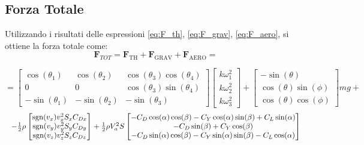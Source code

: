 \clearpage

\subsection{Forza Totale}
Utilizzando i risultati delle espressioni \ref{eq:F_th}, \ref{eq:F_grav}, \ref{eq:F_aero}, si ottiene la forza totale come:
\begin{equation*}
	  	\bm{F}_{TOT} = \bm{F}_{\text{TH}} + \bm{F}_{\text{GRAV}} + \bm{F}_{\text{AERO}} = 
	  	\end{equation*}
	  	
	  	 \begin{equation*}
	  		=  
	  		\begin{bmatrix}
	  			\cos(\theta_{1}) & \cos(\theta_{2}) & {\cos(\theta_{3})\cos(\theta_{4})} \\
	  			0                 & 0                 & {\cos(\theta_{3})\sin(\theta_{4})} \\
	  			-\sin(\theta_{1}) & -\sin(\theta_{2}) & {-\sin(\theta_{3})}
	  		\end{bmatrix}
	  		\begin{bmatrix}
	  			k\omega_{1}^2 \\
	  			k\omega_{2}^2 \\
	  			k\omega_{3}^2 
	  		\end{bmatrix} +  \begin{bmatrix}
	  		-\sin(\theta) \\
	  		\cos(\theta)\sin(\phi) \\
	  		\cos(\theta)\cos(\phi) 
	  		\end{bmatrix} m g +  
	  	\end{equation*}
	  \begin{equation}
	   \resizebox{1\textwidth}{!}{$
        -\frac{1}{2} \rho 
        \begin{bmatrix}
            \operatorname{sgn}(v_x) v_x^2 S_{x} C_{Dx} \\
            \operatorname{sgn}(v_y) v_y^2 S_{y} C_{Dy} \\
            \operatorname{sgn}(v_z) v_z^2 S_{z} C_{Dz}
        \end{bmatrix}
        +
        \frac{1}{2}\rho V_a^2 S
        \begin{bmatrix}
            -C_D \cos(\alpha)\cos(\beta) - C_Y \cos(\alpha) \sin(\beta) + C_L \sin(\alpha) \\
            -C_D \sin(\beta) + C_Y \cos(\beta) \\
            -C_D \sin(\alpha)\cos(\beta) - C_Y \sin(\alpha) \sin(\beta) - C_L \cos(\alpha)
        \end{bmatrix}
        $}
	\label{eq:f_tot}
\end{equation}

